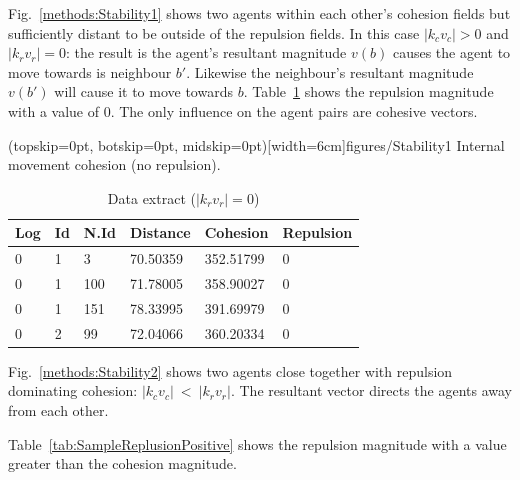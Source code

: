 \documentclass{ieeeaccess}
\begin{document}
Fig.~\ref{methods:Stability1} shows two agents within each other's cohesion fields but sufficiently distant to be outside of the repulsion fields. In this case $|k_cv_c| > 0$ and $|k_rv_r| = 0$: the result is the agent's resultant magnitude $v(b)$ causes the agent to move towards is neighbour $b'$. Likewise the neighbour's resultant magnitude $v(b')$ will cause it to move towards $b$. Table~\ref{tab:SampleReplusion0} shows the repulsion magnitude with a value of 0. The only influence on the agent pairs are cohesive vectors. 

\Figure[t!](topskip=0pt, botskip=0pt, midskip=0pt)[width=6cm]{figures/Stability1}
{Internal movement cohesion (no repulsion).\label{methods:Stability1}}


\begin{table}[H]
\begin{center}
\begin{tabular}{| l | l | l | l | l | l |}
\hline
Log &	Id &	N.Id &	Distance &	{\color{green}Cohesion} &	{\color{red}Repulsion} 	\\ \hline
0 &	1 &	3 	 & 70.50359 &	{\color{green}352.51799} &	{\color{red}0} \\ \hline
0 &	1 &	100 & 71.78005 &	{\color{green}358.90027} &	{\color{red}0} \\ \hline
0 &	1 &	151 & 78.33995 &	{\color{green}391.69979} &	{\color{red}0} \\ \hline
0 &	2 &	99  &	72.04066 &	{\color{green}360.20334} &	{\color{red}0} \\ 
\hline
\end{tabular}\caption{Data extract ($|k_rv_r| = 0$)} \label{tab:SampleReplusion0}
\end{center}
\end{table}

Fig.~\ref{methods:Stability2} shows two agents close together with repulsion dominating cohesion: $|k_cv_c|~<~|k_rv_r|$. The resultant vector directs the agents away from each other. 

Table~\ref{tab:SampleReplusionPositive} shows the repulsion magnitude with a value greater than the cohesion magnitude.
\end{document}
